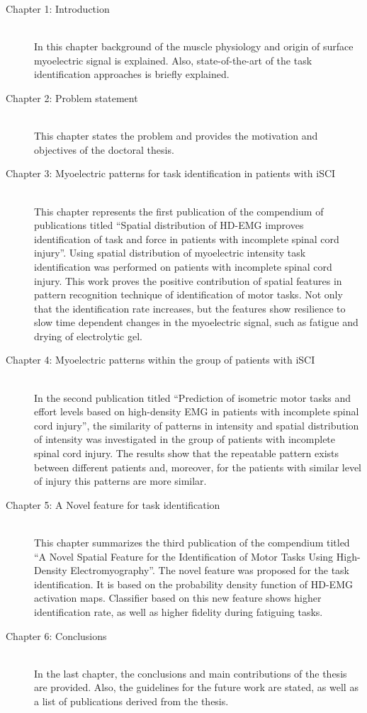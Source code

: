 \begin{description}
\item[Chapter 1: Introduction] \hfill \\
	In this chapter background of the muscle physiology and origin of surface myoelectric signal is explained. Also, state-of-the-art of the task identification approaches is briefly explained.  

\item[Chapter 2: Problem statement] \hfill \\
	This chapter states the problem and provides the motivation and objectives of the doctoral thesis.
	
\item[Chapter 3: Myoelectric patterns for task identification in patients with iSCI] \hfill \\
	This chapter represents the first publication of the compendium of publications titled “Spatial distribution of HD-EMG improves identification of task and force in patients with incomplete spinal cord injury”. Using spatial distribution of myoelectric intensity task identification was performed on patients with incomplete spinal cord injury. This work proves the positive contribution of spatial features in pattern recognition technique of identification of motor tasks. Not only that the identification rate increases, but the features show resilience to slow time dependent changes in the myoelectric signal, such as fatigue and drying of electrolytic gel.
	
\item[Chapter 4: Myoelectric patterns within the group of patients with iSCI] \hfill \\
	In the second publication titled “Prediction of isometric motor tasks and effort levels based on high-density EMG in patients with incomplete spinal cord injury”, the similarity of patterns in intensity and spatial distribution of intensity was investigated in the group of  patients with incomplete spinal cord injury. The results show that the repeatable pattern exists between different patients and, moreover, for the patients with similar level of injury this patterns are more similar.

\item[Chapter 5: A Novel feature for task identification] \hfill \\
	This chapter summarizes the  third publication of the compendium titled “A Novel Spatial Feature for the Identification of Motor Tasks Using High-Density Electromyography”. The novel feature was proposed for the task identification. It is based on the probability density function of HD-EMG activation maps. Classifier based on this new feature shows higher identification rate, as well as higher fidelity during fatiguing tasks.

\item[Chapter 6: Conclusions] \hfill \\
	In the last chapter, the conclusions and main contributions of the thesis are provided. Also, the guidelines for the future work are stated, as well as a list of publications derived from the thesis.

\end{description}





\

